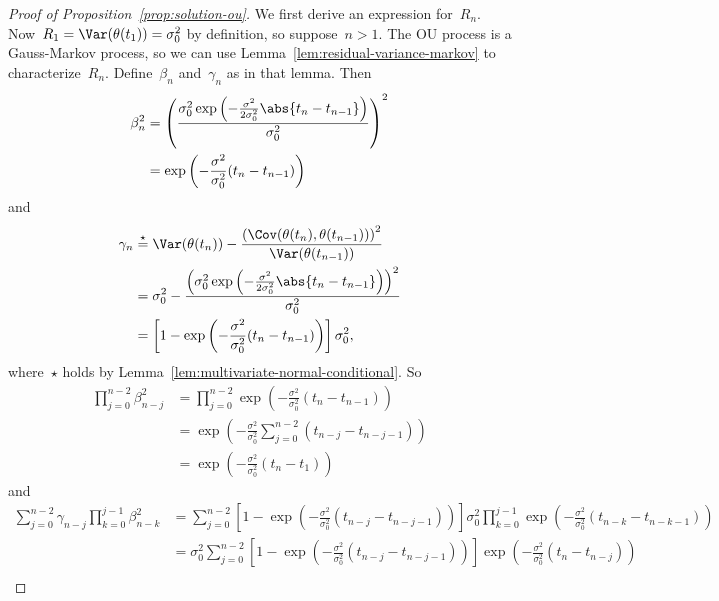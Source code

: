 \begin{proof}[Proof of Proposition~\ref{prop:solution-ou}]
    We first derive an expression for~$R_n$.
    Now~$R_1=\Var(\theta(t_1))=\sigma_0^2$ by definition, so suppose~$n>1$.
    The OU process is a Gauss-Markov process, so we can use Lemma~\ref{lem:residual-variance-markov} to characterize~$R_n$.
    Define~$\beta_n$ and~$\gamma_n$ as in that lemma.
    Then
    \begin{align*}
        \beta_n^2
        &= \left(\frac{\sigma_0^2\exp\left(-\frac{\sigma^2}{2\sigma_0^2}\abs{t_n-t_{n-1}}\right)}{\sigma_0^2}\right)^2 \\
        &= \exp\left(-\frac{\sigma^2}{\sigma_0^2}(t_n-t_{n-1})\right)
    \end{align*}
    and
    \begin{align*}
        \gamma_n
        &\overset{\star}{=} \Var(\theta(t_n))-\frac{\left(\Cov(\theta(t_n),\theta(t_{n-1}))\right)^2}{\Var(\theta(t_{n-1}))} \\
        &= \sigma_0^2-\frac{\left(\sigma_0^2\exp\left(-\frac{\sigma^2}{2\sigma_0^2}\abs{t_n-t_{n-1}}\right)\right)^2}{\sigma_0^2} \\
        &= \left[1-\exp\left(-\frac{\sigma^2}{\sigma_0^2}(t_n-t_{n-1})\right)\right]\sigma_0^2,
    \end{align*}
    where~$\star$ holds by Lemma~\ref{lem:multivariate-normal-conditional}.
    So
    \begin{align*}
        \prod_{j=0}^{n-2}\beta_{n-j}^2
        &= \prod_{j=0}^{n-2}\exp\left(-\frac{\sigma^2}{\sigma_0^2}(t_n-t_{n-1})\right) \\
        &= \exp\left(-\frac{\sigma^2}{\sigma_0^2}\sum_{j=0}^{n-2}(t_{n-j}-t_{n-j-1})\right) \\
        &= \exp\left(-\frac{\sigma^2}{\sigma_0^2}(t_n-t_1)\right)
    \end{align*}
    and
    \begin{align*}
        \sum_{j=0}^{n-2}\gamma_{n-j}\prod_{k=0}^{j-1}\beta_{n-k}^2
        &= \sum_{j=0}^{n-2}\left[1-\exp\left(-\frac{\sigma^2}{\sigma_0^2}(t_{n-j}-t_{n-j-1})\right)\right]\sigma_0^2\prod_{k=0}^{j-1}\exp\left(-\frac{\sigma^2}{\sigma_0^2}(t_{n-k}-t_{n-k-1})\right) \\
        &= \sigma_0^2\sum_{j=0}^{n-2}\left[1-\exp\left(-\frac{\sigma^2}{\sigma_0^2}(t_{n-j}-t_{n-j-1})\right)\right]\exp\left(-\frac{\sigma^2}{\sigma_0^2}(t_{n}-t_{n-j})\right) \\

\end{align*}
\end{proof}

